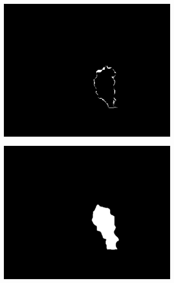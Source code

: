 \documentclass[14pt, a4paper]{extreport}
\begin{document}
\begin{figure}[h!]
\begin{subfigure}{.32\textwidth}
			\includegraphics[width = \textwidth]{image/chapter_3/examples/mask_dif/214}
		\end{subfigure}
		\begin{subfigure}{.32\textwidth}
			\centering
			\includegraphics[width = \textwidth]{image/chapter_3/examples/mask_razmet/240}
			\caption{}
		\end{subfigure}
		\hspace{0.1cm}
		\begin{subfigure}{.32\textwidth}
			\centering

\end{subfigure}
\end{figure}
\end{document}
